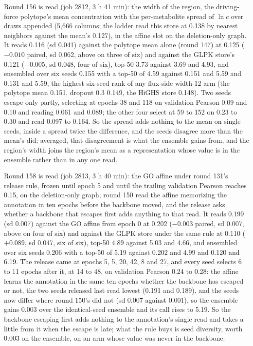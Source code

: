 Round 156 is read (job 2812, 3 h 41 min): the width of the region, the driving-force
polytope's mean concentration with the per-metabolite spread of $\ln c$ over draws
appended (5,666 columns; the ladder read this store at 0.138 by nearest neighbors
against the mean's 0.127), in the affine slot on the deletion-only graph. It reads
0.116 (sd 0.041) against the polytope mean alone (round 147) at 0.125 ($-0.010$
paired, sd 0.062, above on three of six) and against the GLPK store's 0.121 ($-0.005$,
sd 0.048, four of six), top-50 3.73 against 3.69 and 4.93, and ensembled over six seeds
0.155 with a top-50 of 4.59 against 0.151 and 5.59 and 0.131 and 5.59, the highest
six-seed rank of any flux-side width-12 arm (the polytope mean 0.151, dropout 0.3
0.149, the HiGHS store 0.148). Two seeds escape only partly, selecting at epochs 38 and
118 on validation Pearson 0.09 and 0.10 and reading 0.061 and 0.089; the other four
select at 59 to 152 on 0.23 to 0.30 and read 0.097 to 0.164. So the spread adds
nothing to the mean on single seeds, inside a spread twice the difference, and the
seeds disagree more than the mean's did; averaged, that disagreement is what the
ensemble gains from, and the region's width joins the region's mean as a representation
whose value is in the ensemble rather than in any one read.

Round 158 is read (job 2813, 3 h 40 min): the GO affine under round 131's release
rule, frozen until epoch 5 and until the trailing validation Pearson reaches 0.15, on
the deletion-only graph; round 150 read the affine memorizing the annotation in ten
epochs before the backbone moved, and the release asks whether a backbone that escapes
first adds anything to that read. It reads 0.199 (sd 0.007) against the GO affine from
epoch 0 at 0.202 ($-0.003$ paired, sd 0.007, above on four of six) and against the
GLPK store under the same rule at 0.110 ($+0.089$, sd 0.047, six of six), top-50 4.89
against 5.03 and 4.66, and ensembled over six seeds 0.206 with a top-50 of 5.19 against
0.202 and 4.99 and 0.120 and 6.19. The release came at epochs 5, 5, 20, 42, 8 and 27,
and every seed selects 6 to 11 epochs after it, at 14 to 48, on validation Pearson 0.24
to 0.28: the affine learns the annotation in the same ten epochs whether the backbone
has escaped or not, the two seeds released last read lowest (0.191 and 0.189), and the
seeds now differ where round 150's did not (sd 0.007 against 0.001), so the ensemble
gains 0.003 over the identical-seed ensemble and its call rises to 5.19. So the
backbone escaping first adds nothing to the annotation's single read and takes a little
from it when the escape is late; what the rule buys is seed diversity, worth 0.003 on
the ensemble, on an arm whose value was never in the backbone.

